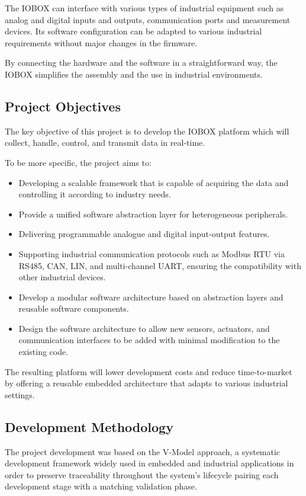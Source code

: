 The IOBOX can interface with various types of industrial equipment such as analog and digital inputs and outputs, communication ports and measurement devices.
Its software configuration can be adapted to various industrial requirements without major changes in the firmware.

By connecting the hardware and the software in a straightforward way, the IOBOX simplifies the assembly and the use in industrial environments.

\subsection{Project Objectives}

The key objective of this project is to develop the IOBOX platform which will collect, handle, control, and transmit data in real-time.

To be more specific, the project aims to:
\begin{itemize}
    \item Developing a scalable framework that is capable of acquiring the data and controlling it according to industry needs.
    \item Provide a unified software abstraction layer for heterogeneous peripherals.
    \item Delivering programmable analogue and digital input-output features.
    \item Supporting industrial communication protocols such as Modbus RTU via RS485, CAN, LIN, and multi-channel UART, ensuring the compatibility with other industrial devices.
    \item Develop a modular software architecture based on abstraction layers and reusable software components.
    \item Design the software architecture to allow new sensors, actuators, and communication interfaces to be added with minimal modification to the existing code.
\end{itemize}

The resulting platform will lower development costs and reduce time-to-market by offering a reusable embedded architecture that adapts to various industrial settings.

\subsection{Development Methodology}
The project development was based on the V-Model approach, a systematic development framework widely used in embedded and industrial applications in order to preserve traceability throughout the system's lifecycle pairing each development stage with a matching validation phase.

